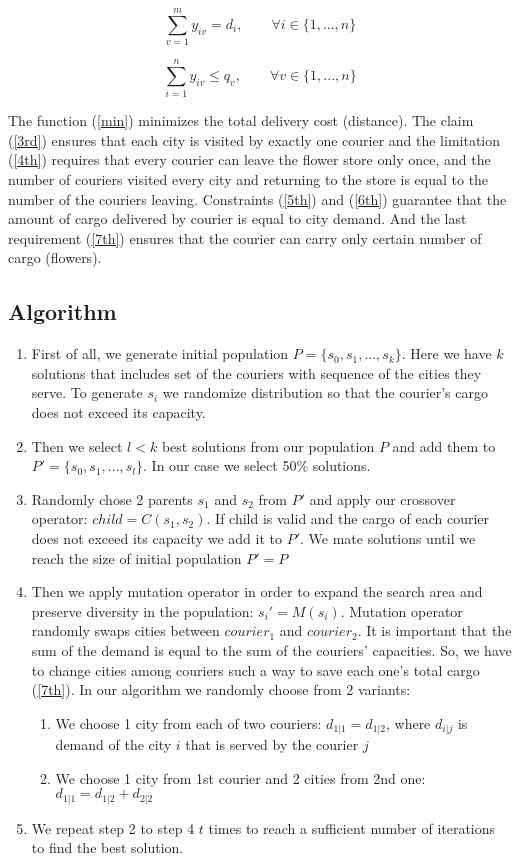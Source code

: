 \documentclass{article}
\begin{document}
\begin{equation} \label{6th}
\sum_{v=1}^{m} y_{iv} = d_i, \qquad \forall i \in \{1,...,n\}
\end{equation}

\begin{equation} \label{7th}
\sum_{i=1}^{n} y_{iv} \leq q_v, \qquad \forall v \in \{1,...,n\}
\end{equation}

The function (\ref{min}) minimizes the total delivery cost (distance). The claim (\ref{3rd}) ensures that each city is visited by exactly one courier and the limitation (\ref{4th}) requires that every courier can leave the flower store only once, and the number of couriers visited every city and returning to the store is equal to the number of the couriers leaving. Constraints (\ref{5th}) and (\ref{6th}) guarantee that the amount of cargo delivered by courier is equal to city demand. And the last requirement (\ref{7th}) ensures that the courier can carry only certain number of cargo (flowers).

\subsection{Algorithm}
\begin{enumerate}
  \item First of all, we generate initial population $ P =  \{s_0,s_1,...,s_k\}$. Here we have $k$ solutions that includes set of the couriers with sequence of the cities they serve. To generate $s_i$ we randomize distribution so that the courier's cargo does not exceed its capacity.
  \item Then we select $l <  k$ best solutions from our population $P$ and add them to $ P' =  \{s_0,s_1,...,s_l\}$. In our case we select 50\% solutions.
  \item Randomly chose 2 parents $s_1$ and $s_2$ from $P'$ and apply our crossover operator: $child = C(s_1,s_2)$. If child is valid and the cargo of each courier does not exceed its capacity we add it to $P'$. We mate solutions until we reach  the size of initial population $P' = P$
  \item Then we apply mutation operator in order to expand the search area and preserve diversity in the population: $s_i' = M(s_i)$. Mutation operator randomly swaps cities between $courier_1$ and $courier_2$. It is important that the sum of the demand is equal to the sum of the couriers' capacities. So, we have to change cities among couriers such a way to save each one's total cargo (\ref{7th}). In our algorithm we randomly choose from 2 variants: 
  \begin{enumerate}
      \item We choose 1 city from each of two couriers: $d_{1|1} = d_{1|2}$, where $d_{i|j}$ is demand of the city $i$ that is served by the courier $j$
      \item We choose 1 city from 1st courier and 2 cities from 2nd one: $d_{1|1} = d_{1|2} + d_{2|2}$
  \end{enumerate}
  \item We repeat step 2 to step 4 $t$ times to reach a sufficient number of iterations to find the best solution.
\end{enumerate}
\end{document}
